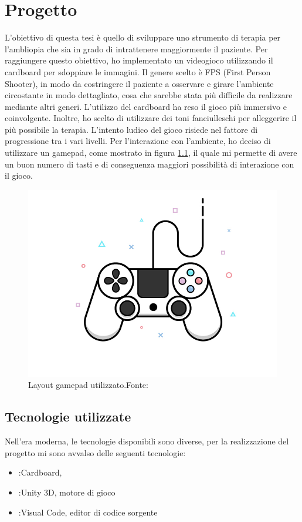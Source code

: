 \documentclass[
a4paper,
cleardoublepage=empty,
headings=twolinechapter,
numbers=autoenddot,
]{scrbook}
\begin{document}
    \chapter{Progetto}
     L'obiettivo di questa tesi è quello di sviluppare uno strumento di terapia per l'ambliopia che sia in grado di intrattenere maggiormente il paziente. Per raggiungere questo obiettivo, ho implementato un videogioco utilizzando il cardboard per sdoppiare le immagini. Il genere scelto è FPS (First Person Shooter), in modo da costringere il paziente a osservare e girare l'ambiente circostante in modo dettagliato, cosa che sarebbe stata più difficile da realizzare mediante altri generi. L'utilizzo del cardboard ha reso il gioco più immersivo e coinvolgente. Inoltre, ho scelto di utilizzare dei toni fanciulleschi per alleggerire il più possibile la terapia. L'intento ludico del gioco risiede nel fattore di progressione tra i vari livelli. Per l'interazione con l'ambiente, ho deciso di utilizzare un gamepad, come mostrato in figura \ref{fig:gamepad}, il quale mi permette di avere un buon numero di tasti e di conseguenza maggiori possibilità di interazione con il gioco.
     \begin{figure}[H]
    	\centering
    	\includegraphics[width=0.8\linewidth]{image/gamepad}
    	\caption{Layout gamepad utilizzato.Fonte:\cite{controller_image}}
    	\label{fig:gamepad}
    \end{figure}
  
    \section{Tecnologie utilizzate}
    Nell'era moderna, le tecnologie disponibili sono diverse, per la realizzazione del progetto mi sono avvalso delle seguenti tecnologie:
    \begin{itemize}
    	\item:Cardboard, 
    	\item:Unity 3D, motore di gioco
    	\item:Visual Code, editor di codice sorgente
    \end{itemize}
\end{document}
